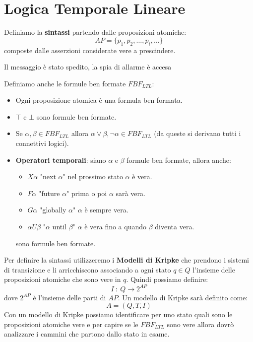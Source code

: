 \section{Logica Temporale Lineare}
Definiamo la \textbf{sintassi} partendo dalle proposizioni atomiche:
\begin{equation}
    AP = \{p_1, p_2, \dots, p_i, \dots\}
\end{equation}
composte dalle asserzioni considerate vere a prescindere.
\begin{esempio}
    Il messaggio è stato spedito, la spia di allarme è accesa
\end{esempio}
\begin{definizione}
    Definiamo anche le formule ben formate $FBF_{LTL}$:
    \begin{itemize}
        \item Ogni proposizione atomica è una formula ben formata.
        \item $\top$ e $\bot$ sono formule ben formate.
        \item Se $\alpha, \beta \in FBF_{LTL}$ allora $\alpha \lor \beta, \lnot
                  \alpha \in FBF_{LTL}$ (da queste si derivano tutti i connettivi
              logici).
        \item \textbf{Operatori temporali}: siano $\alpha$ e $\beta$ formule ben
              formate, allora anche:
              \begin{itemize}
                  \item $X\alpha$ "next $\alpha$" nel prossimo stato $\alpha$ è vera.
                  \item $F\alpha$ "future $\alpha$" prima o poi $\alpha$ sarà vera.
                  \item $G\alpha$ "globally $\alpha$" $\alpha$ è sempre vera.
                  \item $\alpha U \beta$ "$\alpha$ until $\beta$" $\alpha$ è vera
                        fino a quando $\beta$ diventa vera.
              \end{itemize}
              sono formule ben formate.
    \end{itemize}
\end{definizione}
Per definire la sintassi utilizzeremo i \textbf{Modelli di Kripke} che prendono
i sistemi di transizione e li arricchiscono associando a ogni stato $q \in Q$
l'insieme delle proposizioni atomiche che sono vere in $q$. Quindi possiamo
definire:
\begin{equation}
    I \ : \ Q \to 2^{AP}
\end{equation}
dove $2^{AP}$ è l'insieme delle parti di $AP$. Un modello di Kripke sarà
definito come:
\begin{equation}
    A = (Q, T, I)
\end{equation}
Con un modello di Kripke possiamo identificare per uno stato quali sono le
proposizioni atomiche vere e per capire se le $FBF_{LTL}$ sono vere allora dovrò
analizzare i cammini che partono dallo stato in esame.

